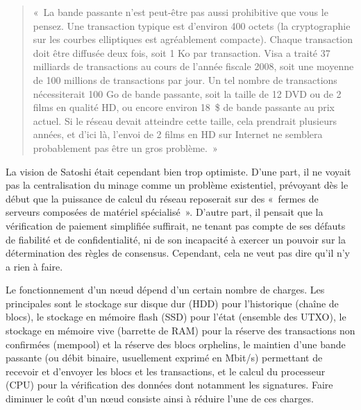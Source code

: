 \begin{quote}
«~La bande passante n'est peut-être pas aussi prohibitive que vous le pensez. Une transaction typique est d'environ 400 octets (la cryptographie sur les courbes elliptiques est agréablement compacte). Chaque transaction doit être diffusée deux fois, soit 1 Ko par transaction. Visa a traité 37 milliards de transactions au cours de l'année fiscale 2008, soit une moyenne de 100 millions de transactions par jour. Un tel nombre de transactions nécessiterait 100 Go de bande passante, soit la taille de 12 DVD ou de 2 films en qualité HD, ou encore environ 18~\$ de bande passante au prix actuel. Si le réseau devait atteindre cette taille, cela prendrait plusieurs années, et d'ici là, l'envoi de 2 films en HD sur Internet ne semblera probablement pas être un gros problème.~»
\end{quote} %

La vision de Satoshi était cependant bien trop optimiste. D'une part, il ne voyait pas la centralisation du minage comme un problème existentiel, prévoyant dès le début que la puissance de calcul du réseau reposerait sur des «~fermes de serveurs composées de matériel spécialisé~». D'autre part, il pensait que la vérification de paiement simplifiée suffirait, ne tenant pas compte de ses défauts de fiabilité et de confidentialité, ni de son incapacité à exercer un pouvoir sur la détermination des règles de consensus. Cependant, cela ne veut pas dire qu'il n'y a rien à faire.

Le fonctionnement d'un nœud dépend d'un certain nombre de charges. Les principales sont le stockage sur disque dur (HDD) pour l'historique (chaîne de blocs), le stockage en mémoire flash (SSD) pour l'état (ensemble des UTXO), le stockage en mémoire vive (barrette de RAM) pour la réserve des transactions non confirmées (mempool) et la réserve des blocs orphelins, le maintien d'une bande passante (ou débit binaire, usuellement exprimé en Mbit/s) permettant de recevoir et d'envoyer les blocs et les transactions, et le calcul du processeur (CPU) pour la vérification des données dont notamment les signatures. Faire diminuer le coût d'un nœud consiste ainsi à réduire l'une de ces charges.

